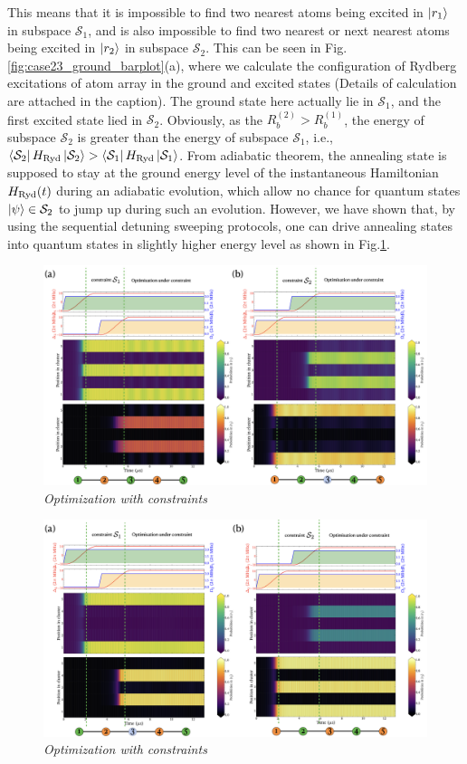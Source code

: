 \documentclass[%
 reprint,
nofootinbib,
 amsmath,amssymb,
 aps,
floatfix,
]{revtex4-2}
\begin{document}
This means that it is impossible to find two nearest atoms being excited in $\ket{r_1}$ in subspace $\mathcal{S}_1$, and is also impossible to find two nearest or next nearest atoms being excited in $\ket{r_2}$ in subspace $\mathcal{S}_2$. This can be seen in Fig.\ref{fig:case23_ground_barplot}(a), where we calculate the configuration of Rydberg excitations of atom array in the ground and excited states (Details of calculation are attached in the caption). The ground state here actually lie in $\mathcal{S}_1$, and the first excited state lied in $\mathcal{S}_2$. Obviously, as the $R^{(2)}_b > R^{(1)}_b$, the energy of subspace $\mathcal{S}_2$ is greater than the energy of subspace $\mathcal{S}_1$, i.e., $\bra{\mathcal{S}_2}H_{\rm Ryd}\ket{\mathcal{S}_2} > \bra{\mathcal{S}_1}H_{\rm Ryd}\ket{\mathcal{S}_1}$. From adiabatic theorem, the annealing state is supposed to stay at the ground energy level of the instantaneous Hamiltonian $H_{\rm Ryd}(t)$ during an adiabatic evolution, which allow no chance for quantum states $\ket{\psi} \in \mathcal{S}_2$ to jump up during such an evolution. However, we have shown that, by using the sequential detuning sweeping protocols, one can drive annealing states into quantum states in slightly higher energy level as shown in Fig.\ref{fig:case2_opt}.

\begin{figure}[ht!]
    \centering
    \includegraphics[width=15cm]{picture/case2_QOconstraint1.png}
    \caption{\textit{Optimization with constraints}}
    \label{fig:case2_opt}
\end{figure}


\begin{figure}[ht!]
    \centering
    \includegraphics[width=14cm]{picture/case3_QOconstraint1.png}
    \caption{\textit{Optimization with constraints}}
    \label{fig:case3_opt}
\end{figure}
\end{document}

